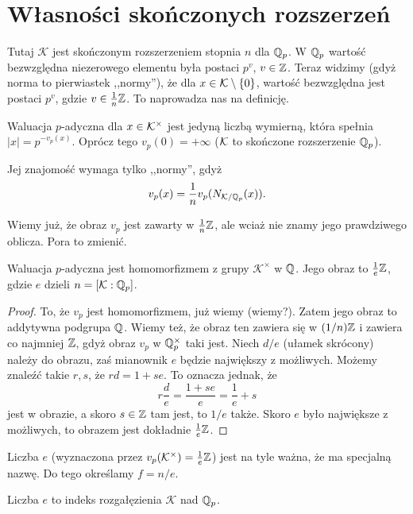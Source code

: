 \section{Własności skończonych rozszerzeń}
Tutaj $\mathcal K$ jest skończonym rozszerzeniem stopnia $n$ dla $\mathbb Q_p$.
W $\mathbb Q_p$ wartość bezwzględna niezerowego elementu była postaci $p^v$, $v \in \mathbb Z$.
Teraz widzimy (gdyż norma to pierwiastek ,,normy''), że dla $x \in \mathcal K \setminus \{0\}$, wartość bezwzględna jest postaci $p^v$, gdzie $v \in \frac 1 n \mathbb Z$.
To naprowadza nas na definicję.

\begin{definicja}
	Waluacja $p$-adyczna dla $x \in \mathcal K^\times$ jest jedyną liczbą wymierną, która spełnia $|x| = p^{-v_p(x)}$.
	Oprócz tego $v_p(0) = + \infty$ ($\mathcal K$ to skończone rozszerzenie $\mathbb Q_p$).
\end{definicja}

Jej znajomość wymaga tylko ,,normy'', gdyż 
\[
	v_p(x) = \frac 1 n v_p(N_{\mathcal K/\mathbb Q_p}(x)).
\]

Wiemy już, że obraz $v_p$ jest zawarty w $\frac 1 n \mathbb Z$, ale wciaż nie znamy jego prawdziwego oblicza.
Pora to zmienić.

\begin{fakt}
	Waluacja $p$-adyczna jest homomorfizmem z grupy $\mathcal K ^\times$ w $\mathbb Q$.
	Jego obraz to $\frac 1 e \mathbb Z$, gdzie $e$ dzieli $n = [\mathcal K : \mathbb Q_p]$.
\end{fakt}

\begin{proof}
	To, że $v_p$ jest homomorfizmem, już wiemy (wiemy?).
	Zatem jego obraz to addytywna podgrupa $\mathbb Q$.
	Wiemy też, że obraz ten zawiera się w $(1/n) \mathbb Z$ i zawiera co najmniej $\mathbb Z$, gdyż obraz $v_p$ w $\mathbb Q_p^\times$ taki jest.
	Niech $d/e$ (ułamek skrócony) należy do obrazu, zaś mianownik $e$ będzie największy z możliwych.
	Możemy znaleźć takie $r, s$, że $rd = 1 + se$.
	To oznacza jednak, że
	\[
		r \frac d e = \frac{1+se} e = \frac 1 e + s
	\]
	jest w obrazie, a skoro $s \in \mathbb Z$ tam jest, to $1/e$ także.
	Skoro $e$ było największe z możliwych, to obrazem jest dokładnie $\frac 1 e \mathbb Z$.
\end{proof}

Liczba $e$ (wyznaczona przez $v_p(\mathcal K^\times) = \textstyle \frac 1 e \mathbb Z$) jest na tyle ważna, że ma specjalną nazwę.
Do tego określamy $f = n/e$.

\begin{definicja}
	Liczba $e$ to indeks rozgałęzienia $\mathcal K$ nad $\mathbb Q_p$.
\end{definicja} 

